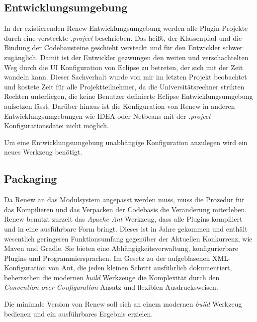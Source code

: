 \subsection{Entwicklungsumgebung} 
	In der existierenden Renew Entwicklungsumgebung werden alle Plugin Projekte durch eine versteckte \textit{.project} beschrieben. Das heißt, der Klassenpfad und die Bindung der Codebausteine geschieht versteckt und für den Entwickler schwer zugänglich. Damit ist der Entwickler gezwungen den weiten und verschachtelten Weg durch die UI Konfiguration von Eclipse zu betreten, der sich mit der Zeit wandeln kann. Dieser Sachverhalt wurde von mir im letzten Projekt beobachtet und kostete Zeit für alle Projektteilnehmer, da die Universitätsrechner strikten Rechten unterliegen, die keine Benutzer definierte Eclipse Entwicklungsumgebung aufsetzen lässt. Darüber hinaus ist die Konfiguration von Renew in anderen Entwicklungsumgebungen wie IDEA oder Netbeans mit der \textit{.project} Konfigurationsdatei nicht möglich. \bigbreak

	Um eine Entwicklungsumgebung unabhängige Konfiguration anzulegen wird ein neues Werkzeug benötigt. 

\subsection{Packaging}
	Da Renew an das Modulsystem angepasst werden muss, muss die Prozedur für das Kompilieren  und das Verpacken der Codebasis die Veränderung miterleben.\newline
	Renew benutzt zurzeit das \textit{Apache Ant} Werkzeug, dass alle Plugins kompiliert und in eine ausführbare Form bringt. Dieses ist in Jahre gekommen und enthält wesentlich geringeren Funktionsumfang gegenüber der Aktuellen Konkurrenz, wie Maven und Gradle. Sie bieten eine Abhängigkeitsverwaltung, konfigurierbare Plugins und Programmiersprachen. Im Gesetz zu der aufgeblasenen XML-Konfiguration von Ant, die jeden kleinen Schritt ausführlich dokumentiert, beherrschen die modernen \textit{build} Werkzeuge die Komplexität durch den \textit{Convention over Configuration} Ansatz und flexiblen Ausdrucksweisen. \bigbreak

	Die minimale Version von Renew soll sich an einem modernen \textit{build} Werkzeug bedienen und ein ausführbares Ergebnis erzielen.

